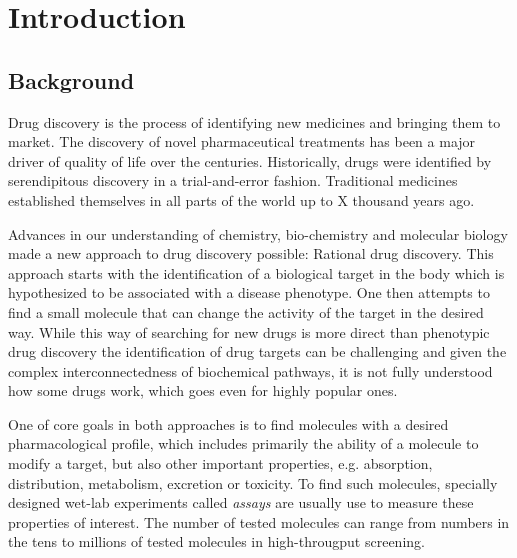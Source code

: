 \chapter{Introduction\label{chap:introduction}}
\section{Background}
Drug discovery is the process of identifying new medicines and bringing them to
market. The discovery of novel pharmaceutical treatments has been a major driver
of quality of life over the centuries. Historically, drugs were identified 
by serendipitous discovery in a trial-and-error fashion. Traditional medicines 
established themselves in all parts of the world up to X thousand years ago.

Advances in our understanding of chemistry, bio-chemistry and molecular
biology made a new approach to drug discovery possible: Rational drug discovery.
This approach starts with the identification of a biological target in the body 
which is hypothesized to be associated with a disease phenotype. 
One then attempts to find a small molecule that can change the activity of 
the target in the desired way. While this way of searching for new drugs 
is more direct than phenotypic drug discovery the identification of 
drug targets can be challenging and given the complex interconnectedness 
of biochemical pathways, it is not fully understood how some drugs work, 
which goes even for highly popular ones.






One of core goals in both approaches is to find molecules with a desired
pharmacological profile, which includes primarily the ability of a molecule to
modify a target, but also other important
properties, e.g. absorption, distribution, metabolism, excretion or toxicity. 
To find such molecules, specially designed wet-lab experiments called \emph{assays} 
are usually use to measure these properties of interest. The number of tested 
molecules can range from numbers in the tens to millions of tested molecules
in high-througput screening. 

